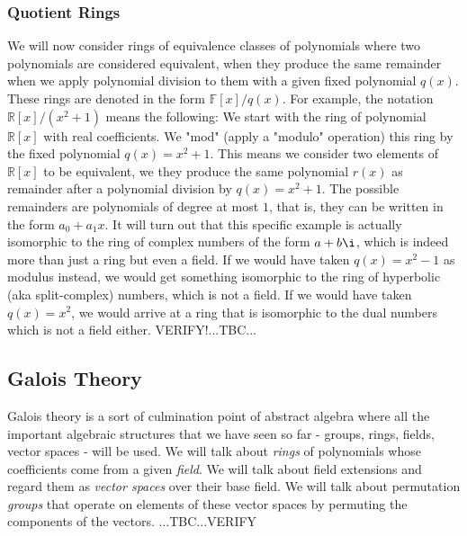 \subsubsection{Quotient Rings}
We will now consider rings of equivalence classes of polynomials where two polynomials are considered equivalent, when they produce the same remainder when we apply polynomial division to them with a given fixed polynomial $q(x)$. These rings are denoted in the form $\mathbb{F}[x] / q(x)$. For example, the notation $\mathbb{R}[x] / (x^2 + 1)$ means the following: We start with the ring of polynomial $\mathbb{R}[x]$ with real coefficients. We "mod" (apply a "modulo" operation) this ring by the fixed polynomial $q(x) = x^2 + 1$. This means we consider two elements of $\mathbb{R}[x]$ to be equivalent, we they produce the same polynomial $r(x)$ as remainder after a polynomial division by $q(x) = x^2 + 1$. The possible remainders are polynomials of degree at most $1$, that is, they can be written in the form $a_0 + a_1 x$. It will turn out that this specific example is actually isomorphic to the ring of complex numbers of the form $a + b \i$, which is indeed more than just a ring but even a field. If we would have taken $q(x) = x^2 - 1$ as modulus instead, we would get something isomorphic to the ring of hyperbolic (aka split-complex) numbers, which is not a field. If we would have taken $q(x) = x^2$, we would arrive at a ring that is isomorphic to the dual numbers which is not a field either.  VERIFY!...TBC...







\subsection{Galois Theory}
Galois theory is a sort of culmination point of abstract algebra where all the important algebraic structures that we have seen so far - groups, rings, fields, vector spaces - will be used. We will talk about \emph{rings} of polynomials whose coefficients come from a given \emph{field}. We will talk about field extensions and regard them as \emph{vector spaces} over their base field. We will talk about permutation \emph{groups} that operate on elements of these vector spaces by permuting the components of the vectors. ...TBC...VERIFY



